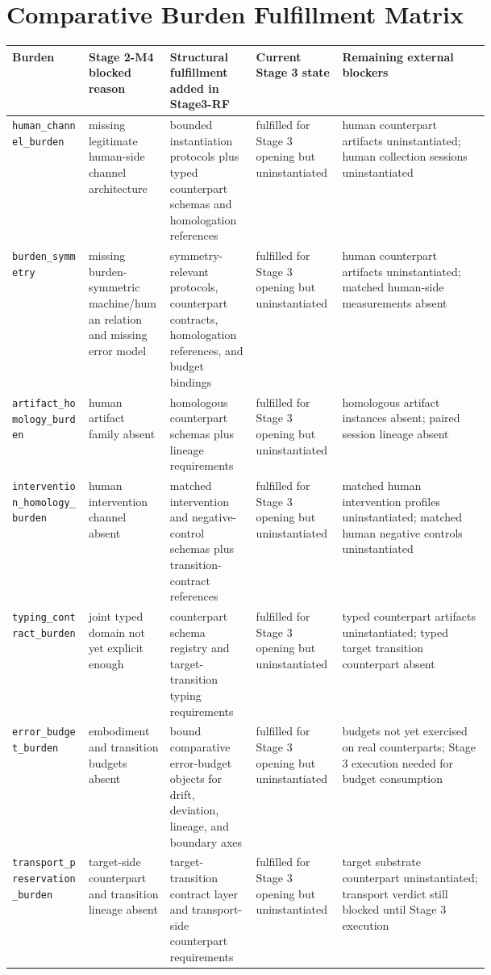 \documentclass[11pt,a4paper]{article}
\theoremstyle{definition}
\begin{document}
\section{Comparative Burden Fulfillment Matrix}
\begin{center}
\small
\begin{tabularx}{\linewidth}{@{}p{0.16\linewidth}p{0.17\linewidth}p{0.18\linewidth}p{0.18\linewidth}Y@{}}
\toprule
Burden & Stage 2-M4 blocked reason & Structural fulfillment added in Stage3-RF & Current Stage 3 state & Remaining external blockers \\
\midrule
\texttt{human\_channel\_burden} & missing legitimate human-side channel architecture & bounded instantiation protocols plus typed counterpart schemas and homologation references & fulfilled for Stage 3 opening but uninstantiated & human counterpart artifacts uninstantiated; human collection sessions uninstantiated \\
\texttt{burden\_symmetry} & missing burden-symmetric machine/human relation and missing error model & symmetry-relevant protocols, counterpart contracts, homologation references, and budget bindings & fulfilled for Stage 3 opening but uninstantiated & human counterpart artifacts uninstantiated; matched human-side measurements absent \\
\texttt{artifact\_homology\_burden} & human artifact family absent & homologous counterpart schemas plus lineage requirements & fulfilled for Stage 3 opening but uninstantiated & homologous artifact instances absent; paired session lineage absent \\
\texttt{intervention\_homology\_burden} & human intervention channel absent & matched intervention and negative-control schemas plus transition-contract references & fulfilled for Stage 3 opening but uninstantiated & matched human intervention profiles uninstantiated; matched human negative controls uninstantiated \\
\texttt{typing\_contract\_burden} & joint typed domain not yet explicit enough & counterpart schema registry and target-transition typing requirements & fulfilled for Stage 3 opening but uninstantiated & typed counterpart artifacts uninstantiated; typed target transition counterpart absent \\
\texttt{error\_budget\_burden} & embodiment and transition budgets absent & bound comparative error-budget objects for drift, deviation, lineage, and boundary axes & fulfilled for Stage 3 opening but uninstantiated & budgets not yet exercised on real counterparts; Stage 3 execution needed for budget consumption \\
\texttt{transport\_preservation\_burden} & target-side counterpart and transition lineage absent & target-transition contract layer and transport-side counterpart requirements & fulfilled for Stage 3 opening but uninstantiated & target substrate counterpart uninstantiated; transport verdict still blocked until Stage 3 execution \\
\bottomrule
\end{tabularx}
\normalsize
\end{center}
\end{document}
